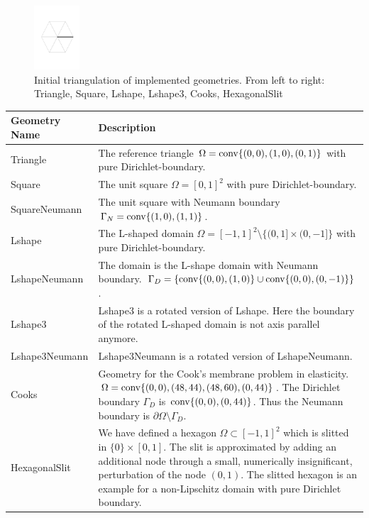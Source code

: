 \begin{figure}[h!]
\includegraphics[width=0.15\textwidth]{images/sect_ImplementedProblems_HexagonalSlit.pdf}
\caption{Initial triangulation of implemented geometries. From left to right: Triangle, Square, Lshape, Lshape3, Cooks, HexagonalSlit}
\end{figure}

\begin{tabular}{p{}p{}}
Geometry Name 	& 	Description \\
\hline
Triangle				& The reference triangle $\Omega=\operatorname{conv}\{(0,0),(1,0),(0,1)\}$ with pure Dirichlet-boundary.\\
Square					& The unit square $\Omega=[0,1]^2$ with pure Dirichlet-boundary.\\
SquareNeumann		& The unit square with Neumann boundary $\Gamma_N=\operatorname{conv}\{(1,0),(1,1)\}$.\\
Lshape          & The L-shaped domain $\Omega=[-1,1]^2\setminus\{(0,1]\times(0,-1]\}$ with pure Dirichlet-boundary.\\
LshapeNeumann		& The domain is the L-shape domain with Neumann boundary.  $\Gamma_D=\left\{\operatorname{conv}\{(0,0),(1,0)\}\cup\operatorname{conv}\{(0,0),(0,-1)\}\right\}$.\\
Lshape3         & Lshape3 is a rotated version of Lshape. Here the boundary of the rotated L-shaped domain is not axis parallel anymore.\\
Lshape3Neumann  & Lshape3Neumann is a rotated version of LshapeNeumann.\\
Cooks						& Geometry for the Cook's membrane problem in elasticity. $\Omega=\operatorname{conv}\{(0,0),(48,44),(48,60),(0,44)\}$. The Dirichlet boundary $\Gamma_D$ is $\operatorname{conv}\{(0,0),(0,44)\}$. Thus the Neumann boundary is $\partial\Omega\setminus\Gamma_D$.\\
HexagonalSlit   & We have defined a hexagon $\Omega\subset[-1,1]^2$ which is slitted in $\{0\}\times[0,1]$. The slit is approximated by adding an additional node through a small, numerically insignificant, perturbation of the node $(0,1)$. The slitted hexagon is an example for a non-Lipschitz domain with pure Dirichlet boundary.
\end{tabular}

